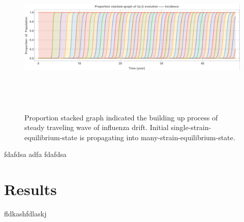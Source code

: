 \documentclass[preprint,12pt]{elsarticle}
\begin{document}
\begin{figure}
  \centering
  \includegraphics[width=6in,height=3in]{figures/Proportion}
  \caption{Proportion stacked graph indicated the building up process of steady traveling wave of influenza drift.
  Initial single-strain-equilibrium-state is propagating into many-strain-equilibrium-state.}
\label{fig:Proportion}
\end{figure}

fdafdsa
adfa
fdafdsa



\section{Results}fldkashfdlaskj
\end{document}
